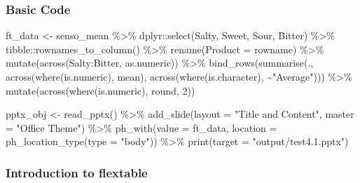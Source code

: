\documentclass[
]{book}
\newenvironment{Shaded}{\begin{snugshade}}{\end{snugshade}}
\newcommand{\AttributeTok}[1]{\textcolor[rgb]{0.77,0.63,0.00}{#1}}
\newcommand{\DecValTok}[1]{\textcolor[rgb]{0.00,0.00,0.81}{#1}}
\newcommand{\FunctionTok}[1]{\textcolor[rgb]{0.00,0.00,0.00}{#1}}
\newcommand{\NormalTok}[1]{#1}
\newcommand{\OtherTok}[1]{\textcolor[rgb]{0.56,0.35,0.01}{#1}}
\newcommand{\SpecialCharTok}[1]{\textcolor[rgb]{0.00,0.00,0.00}{#1}}
\newcommand{\StringTok}[1]{\textcolor[rgb]{0.31,0.60,0.02}{#1}}
\begin{document}
\hypertarget{basic-code}{%
\subsubsection{Basic Code}\label{basic-code}}

\begin{Shaded}
\begin{Highlighting}[]
\NormalTok{ft\_data }\OtherTok{\textless{}{-}}\NormalTok{ senso\_mean }\SpecialCharTok{\%\textgreater{}\%}
\NormalTok{  dplyr}\SpecialCharTok{::}\FunctionTok{select}\NormalTok{(Salty, Sweet, Sour, Bitter) }\SpecialCharTok{\%\textgreater{}\%} 
\NormalTok{  tibble}\SpecialCharTok{::}\FunctionTok{rownames\_to\_column}\NormalTok{() }\SpecialCharTok{\%\textgreater{}\%} 
  \FunctionTok{rename}\NormalTok{(}\AttributeTok{Product =}\NormalTok{ rowname) }\SpecialCharTok{\%\textgreater{}\%} 
  \FunctionTok{mutate}\NormalTok{(}\FunctionTok{across}\NormalTok{(Salty}\SpecialCharTok{:}\NormalTok{Bitter, as.numeric)) }\SpecialCharTok{\%\textgreater{}\%} 
  \FunctionTok{bind\_rows}\NormalTok{(}\FunctionTok{summarise}\NormalTok{(.,}
                      \FunctionTok{across}\NormalTok{(}\FunctionTok{where}\NormalTok{(is.numeric), mean),}
                      \FunctionTok{across}\NormalTok{(}\FunctionTok{where}\NormalTok{(is.character), }\SpecialCharTok{\textasciitilde{}}\StringTok{"Average"}\NormalTok{))) }\SpecialCharTok{\%\textgreater{}\%} 
  \FunctionTok{mutate}\NormalTok{(}\FunctionTok{across}\NormalTok{(}\FunctionTok{where}\NormalTok{(is.numeric), round, }\DecValTok{2}\NormalTok{)) }

\NormalTok{pptx\_obj }\OtherTok{\textless{}{-}} \FunctionTok{read\_pptx}\NormalTok{() }\SpecialCharTok{\%\textgreater{}\%}
  \FunctionTok{add\_slide}\NormalTok{(}\AttributeTok{layout =} \StringTok{"Title and Content"}\NormalTok{, }\AttributeTok{master =} \StringTok{"Office Theme"}\NormalTok{) }\SpecialCharTok{\%\textgreater{}\%}
  \FunctionTok{ph\_with}\NormalTok{(}\AttributeTok{value =}\NormalTok{ ft\_data, }\AttributeTok{location =} \FunctionTok{ph\_location\_type}\NormalTok{(}\AttributeTok{type =} \StringTok{"body"}\NormalTok{)) }\SpecialCharTok{\%\textgreater{}\%}
  \FunctionTok{print}\NormalTok{(}\AttributeTok{target =} \StringTok{"output/test4.1.pptx"}\NormalTok{) }
\end{Highlighting}
\end{Shaded}

\hypertarget{introduction-to-flextable}{%
\subsubsection{Introduction to flextable}\label{introduction-to-flextable}}
\end{document}
